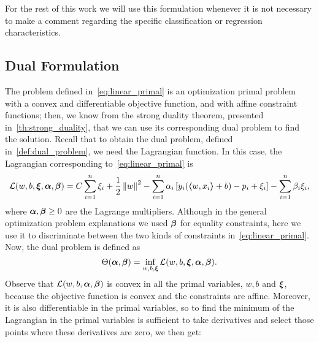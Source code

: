 %
For the rest of this work we will use this formulation whenever it is not necessary to make a comment regarding the specific classification or regression characteristics.

\subsection{Dual Formulation}
%
The problem defined in~\eqref{eq:linear_primal} is an optimization primal problem with a convex and differentiable objective function, and with affine constraint functions; then, we know from the strong duality theorem, presented in~\ref{th:strong_duality}, that we can use its corresponding dual problem to find the solution. Recall that to obtain the dual problem, defined in~\ref{def:dual_problem}, we need the Lagrangian function. In this case, the Lagrangian corresponding to~\ref{eq:linear_primal} is 
\begin{equation}
    \label{eq:linear_lagr}
    \lagr(w, b, \fv{\xi}, \fv{\alpha}, \fv{\beta}) = C \sum_{i=1}^\nsamples \xi_i + \frac{1}{2} \norm{w}^2 - \sum_{i=1}^\nsamples \alpha_i \left[ y_i (\dotp{w}{x_i} + b) - p_i + \xi_i \right] - \sum_{i=1}^\nsamples \beta_i \xi_i ,
\end{equation}
%
where $\bm{\alpha}, \bm{\beta} \geq 0$ are the Lagrange multipliers. Although in the general optimization problem explanations we used $\bm{\beta}$ for equality constraints, here we use it to discriminate between the two kinds of constraints in~\eqref{eq:linear_primal}. 
%
Now, the dual problem is defined as 
$$ \Theta(\bm{\alpha}, \bm{\beta}) = \inf_{w, b, \bm{\xi}} \mathcal{L}(w, b, \bm{\xi}, \bm{\alpha}, \bm{\beta}) . $$
Observe that $\mathcal{L}(w, b, \bm{\alpha}, \bm{\beta})$ is convex in all the primal variables, $w, b$ and $\bm{\xi}$, because the objective function is convex and the constraints are affine. Moreover, it is also differentiable in the primal variables, so to find the minimum of the Lagrangian in the primal variables is sufficient to take derivatives and select those points where these derivatives are zero, we then get:
